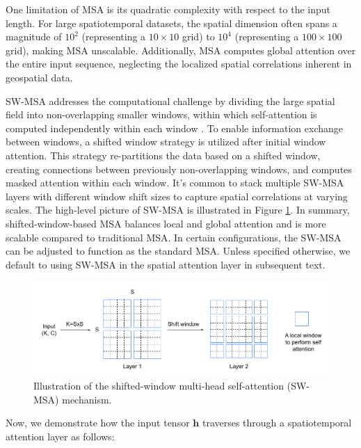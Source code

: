 \documentclass[review]{elsarticle}
\begin{document}
One limitation of MSA is its quadratic complexity with respect to the input length. For large spatiotemporal datasets, the spatial dimension often spans a magnitude of $10^2$ (representing a $10\times 10$ grid) to $10^4$ (representing a $100 \times 100$ grid), making MSA unscalable. Additionally, MSA computes global attention over the entire input sequence, neglecting the localized spatial correlations inherent in geospatial data. 

SW-MSA addresses the computational challenge by dividing the large spatial field into non-overlapping smaller windows, within which self-attention is computed independently within each window \citep{liu2021swin}. To enable information exchange between windows, a shifted window strategy is utilized after initial window attention. This strategy re-partitions the data based on a shifted window, creating connections between previously non-overlapping windows, and computes masked attention within each window. It's common to stack multiple SW-MSA layers with different window shift sizes to capture spatial correlations at varying scales. The high-level picture of SW-MSA is illustrated in Figure \ref{fig: sw_msa}. In summary, shifted-window-based MSA balances local and global attention and is more scalable compared to traditional MSA. In certain configurations, the SW-MSA can be adjusted to function as the standard MSA. Unless specified otherwise, we default to using SW-MSA in the spatial attention layer in subsequent text.



\begin{figure}
\centering
\includegraphics[width=\textwidth]{figure/sw_msa.pdf}
\caption{Illustration of the shifted-window multi-head self-attention (SW-MSA) mechanism.}
\label{fig: sw_msa}
\end{figure}




Now, we demonstrate how the input tensor $\boldsymbol{h}$ traverses through a spatiotemporal attention layer as follows:
\end{document}
